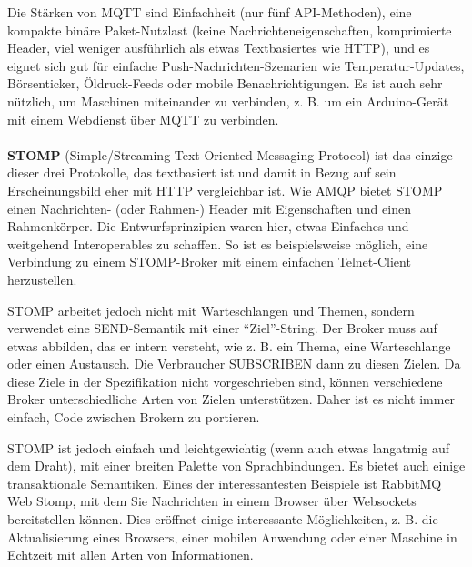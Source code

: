 Die Stärken von MQTT sind Einfachheit (nur fünf API-Methoden), eine kompakte binäre Paket-Nutzlast (keine Nachrichteneigenschaften, komprimierte Header, viel weniger ausführlich als etwas Textbasiertes wie HTTP), und es eignet sich gut für einfache Push-Nachrichten-Szenarien wie Temperatur-Updates, Börsenticker, Öldruck-Feeds oder mobile Benachrichtigungen. Es ist auch sehr nützlich, um Maschinen miteinander zu verbinden, z. B. um ein Arduino-Gerät mit einem Webdienst über MQTT zu verbinden.
\\\\
\textbf{STOMP} (Simple/Streaming Text Oriented Messaging Protocol) ist das einzige dieser drei Protokolle, das textbasiert ist und damit in Bezug auf sein Erscheinungsbild eher mit HTTP vergleichbar ist. Wie AMQP bietet STOMP einen Nachrichten- (oder Rahmen-) Header mit Eigenschaften und einen Rahmenkörper. Die Entwurfsprinzipien waren hier, etwas Einfaches und weitgehend Interoperables zu schaffen. So ist es beispielsweise möglich, eine Verbindung zu einem STOMP-Broker mit einem einfachen Telnet-Client herzustellen.

STOMP arbeitet jedoch nicht mit Warteschlangen und Themen, sondern verwendet eine SEND-Semantik mit einer \enquote{Ziel}-String. Der Broker muss auf etwas abbilden, das er intern versteht, wie z. B. ein Thema, eine Warteschlange oder einen Austausch. Die Verbraucher SUBSCRIBEN dann zu diesen Zielen. Da diese Ziele in der Spezifikation nicht vorgeschrieben sind, können verschiedene Broker unterschiedliche Arten von Zielen unterstützen. Daher ist es nicht immer einfach, Code zwischen Brokern zu portieren.

STOMP ist jedoch einfach und leichtgewichtig (wenn auch etwas langatmig auf dem Draht), mit einer breiten Palette von Sprachbindungen. Es bietet auch einige transaktionale Semantiken. Eines der interessantesten Beispiele ist RabbitMQ Web Stomp, mit dem Sie Nachrichten in einem Browser über Websockets bereitstellen können. Dies eröffnet einige interessante Möglichkeiten, z. B. die Aktualisierung eines Browsers, einer mobilen Anwendung oder einer Maschine in Echtzeit mit allen Arten von Informationen.

